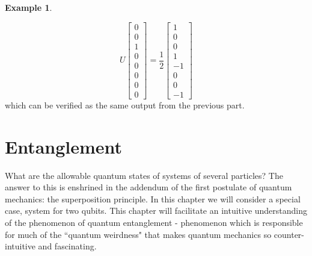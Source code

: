 \documentclass[12pt, oneside]{book}
\theoremstyle{definition}
\theoremstyle{definition}
\newtheorem{example}{Example}[section]
\theoremstyle{remark}
\begin{document}
\begin{example}
\begin{enumerate}
        \[
            U\begin{bmatrix} 0 \\ 0 \\ 1 \\ 0 \\ 0 \\ 0 \\ 0 \\ 0 \end{bmatrix}=\frac{1}{2}\begin{bmatrix} 1 \\ 0 \\ 0 \\ 1 \\ -1 \\ 0 \\ 0 \\ -1 \end{bmatrix}
        \]
        which can be verified as the same output from the previous part.
    \end{enumerate}
\end{example}

\chapter{Entanglement}
What are the allowable quantum states of systems of several particles? The answer to this is enshrined in the addendum of the first postulate of quantum mechanics: the superposition principle. In this chapter we will consider a special case, system for two qubits. This chapter will facilitate an intuitive understanding of the phenomenon of quantum entanglement - phenomenon which is responsible for much of the ``quantum weirdness" that makes quantum mechanics so counter-intuitive and fascinating.
\end{document}
